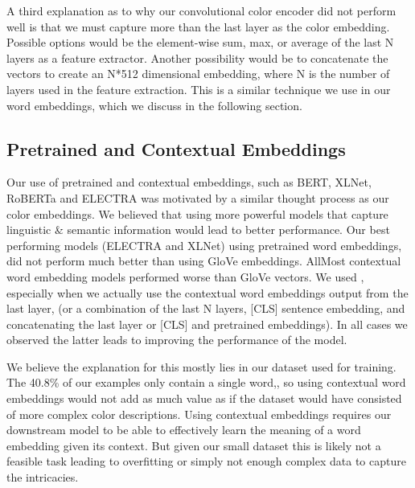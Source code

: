 \par
A third explanation as to why our convolutional color encoder did not perform well is that we must capture more than the last layer as the color embedding. Possible options would be the element-wise sum, max, or average of the last N layers as a feature extractor. Another possibility would be to concatenate the vectors to create an N*512 dimensional embedding, where N is the number of layers used in the feature extraction. This is a similar technique we use in our word embeddings, which we discuss in the following section.

\subsection{Pretrained and Contextual Embeddings}

Our use of pretrained and contextual embeddings, such as BERT, XLNet, RoBERTa and ELECTRA was motivated by a similar thought process as our color embeddings. We believed that using more powerful models that capture linguistic \& semantic information would lead to better performance. Our best performing models (ELECTRA and XLNet) using pretrained word embeddings, did not perform much better than using GloVe embeddings. AllMost contextual word embedding models performed worse than GloVe vectors. We used , especially when we actually use the contextual word embeddings output from the last layer, (or a combination of the last N layers, [CLS] sentence embedding, and concatenating the last layer or [CLS] and pretrained embeddings). In all cases we observed the latter leads to improving the performance of the model.

\par
We believe the explanation for this mostly lies in our dataset used for training. The 40.8\% of our examples only contain a single  word,, so using contextual word embeddings would not add as much value as if the dataset would have consisted of more complex color descriptions. Using contextual embeddings requires our downstream  model to be able to effectively learn the meaning of a word embedding given its context. But given our small dataset this is likely not a feasible task leading to overfitting or simply not enough complex data to capture the intricacies.

